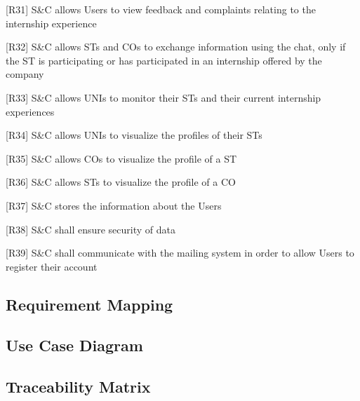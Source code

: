 [R31] S\&C allows Users to view feedback and complaints relating to the internship experience

[R32] S\&C allows STs and COs to exchange information using the chat, only if the ST is participating or has participated in an internship offered by the company

[R33] S\&C allows UNIs to monitor their STs and their current internship experiences

[R34] S\&C allows UNIs to visualize the profiles of their STs

[R35] S\&C allows COs to visualize the profile of a ST

[R36] S\&C allows STs to visualize the profile of a CO

[R37] S\&C stores the information about the Users

[R38] S\&C shall ensure security of data

[R39] S\&C shall communicate with the mailing system in order to allow Users to register their account

\subsection{Requirement Mapping}
\subsection{Use Case Diagram}
\subsection{Traceability Matrix}


